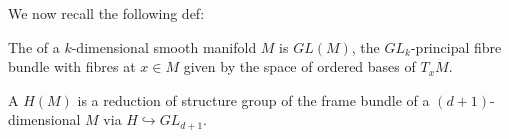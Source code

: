 \documentclass{article}
\begin{document}
We now recall the following def:

\begin{definition}
	The  of a $k$-dimensional smooth manifold $M$ is $GL(M)$, the $GL_k$-principal fibre bundle with fibres at $x \in M$ given by the space of ordered bases of $T_xM$. 
\end{definition}

\begin{definition}
	A  $H(M)$ is a reduction of structure group of the frame bundle of a $(d+1)$-dimensional $M$ via $H \hookrightarrow GL_{d+1} $.
\end{definition}





\end{document}
